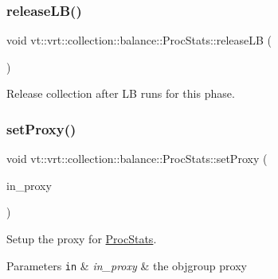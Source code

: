\subsubsection{\texorpdfstring{release\+L\+B()}{releaseLB()}}
{\footnotesize\ttfamily void vt\+::vrt\+::collection\+::balance\+::\+Proc\+Stats\+::release\+LB (\begin{DoxyParamCaption}{ }\end{DoxyParamCaption})}



Release collection after LB runs for this phase. 

\mbox{\label{structvt_1_1vrt_1_1collection_1_1balance_1_1_proc_stats_a3215c14cb6679e9751b0fb51d5d72fe0}} 
\subsubsection{\texorpdfstring{set\+Proxy()}{setProxy()}}
{\footnotesize\ttfamily void vt\+::vrt\+::collection\+::balance\+::\+Proc\+Stats\+::set\+Proxy (\begin{DoxyParamCaption}\item[{\hyperlink{structvt_1_1objgroup_1_1proxy_1_1_proxy}{objgroup\+::proxy\+::\+Proxy}$<$ \hyperlink{structvt_1_1vrt_1_1collection_1_1balance_1_1_proc_stats}{Proc\+Stats} $>$}]{in\+\_\+proxy }\end{DoxyParamCaption})\hspace{0.3cm}{\ttfamily [private]}}



Setup the proxy for {\ttfamily \hyperlink{structvt_1_1vrt_1_1collection_1_1balance_1_1_proc_stats}{Proc\+Stats}}. 


\begin{DoxyParams}[1]{Parameters}
\mbox{\tt in}  & {\em in\+\_\+proxy} & the objgroup proxy \\
\hline
\end{DoxyParams}
\mbox{\label{structvt_1_1vrt_1_1collection_1_1balance_1_1_proc_stats_a6b8af21b777599060c4a532a5adb0100}} 
